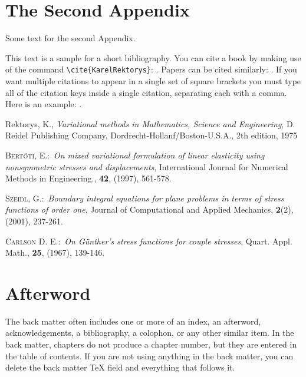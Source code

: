\documentclass[letterpaper,12pt,openany,reqno]{book}%
\begin{document}
\chapter{The Second Appendix}

Some text for the second Appendix.

This text is a sample for a short bibliography. You can cite a book by making use of
the command \verb"\cite{KarelRektorys}": \cite{KarelRektorys}. Papers can be cited
similarly: \cite{Bertoti97}. If you want multiple citations to appear in a single set
of square brackets you must type all of the citation keys inside a single citation,
separating each with a comma. Here is an example: \cite{Bertoti97, Szeidl2001,
Carlson67}.

\begin{thebibliography}{9}
Rektorys, K., \textit{Variational methods in Mathematics,
Science and Engineering}, D. Reidel Publishing Company,
Dordrecht-Hollanf/Boston-U.S.A., 2th edition, 1975

 \textsc{Bert\'{o}ti, E.}:\ \textit{On mixed variational formulation
of linear elasticity using nonsymmetric stresses and displacements}, International
Journal for Numerical Methods in Engineering., \textbf{42}, (1997), 561-578.

 \textsc{Szeidl, G.}:\ \textit{Boundary integral equations for
plane problems in terms of stress functions of order one}, Journal of Computational and
Applied Mechanics, \textbf{2}(2), (2001), 237-261.

  \textsc{Carlson D. E.}:\ \textit{On G\"{u}nther's stress functions
for couple stresses}, Quart. Appl. Math., \textbf{25}, (1967), 139-146.
\end{thebibliography}

\backmatter

\chapter{Afterword}

The back matter often includes one or more of an index, an afterword,
acknowledgements, a bibliography, a colophon, or any other similar item. In
the back matter, chapters do not produce a chapter number, but they are
entered in the table of contents. If you are not using anything in the back
matter, you can delete the back matter TeX field and everything that follows it.
\end{document}
